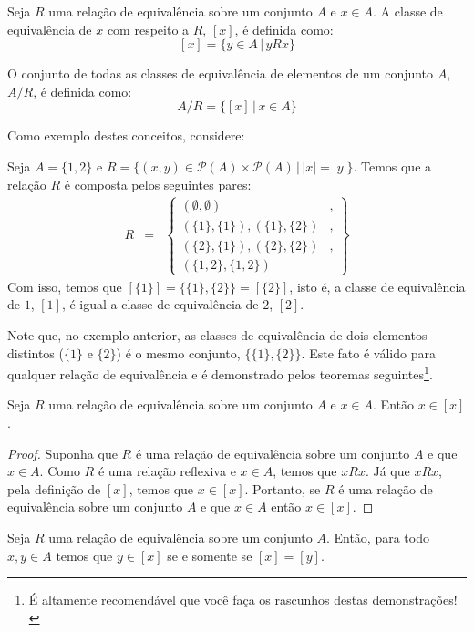 \begin{Definition}
Seja $R$ uma relação de equivalência sobre um conjunto $A$ e $x \in
A$. A classe de equivalência de $x$ com respeito a $R$, $[x]$, é
definida como:
\[
[x] =\{y \in A\,|\, yRx\}
\]

O conjunto de todas as classes de equivalência de elementos de um
conjunto $A$, $A / R$, é definida como:
\[
A / R =\{[x]\,|\,x \in A\}
\]
\end{Definition}
Como exemplo destes conceitos, considere:
\begin{Example}
Seja $A =\{1,2\}$ e $R
=\{(x,y)\in\mathcal{P}(A)\times\mathcal{P}(A)\,|\,|x| = |y|\}$. Temos
que a relação $R$ é composta pelos seguintes pares:
\[
\begin{array}{lcl}
R &=&\left\{
\begin{array}{lc}
   (\emptyset,\emptyset)&,\\
   (\{1\},\{1\}),(\{1\},\{2\}) &,\\
   (\{2\},\{1\}),(\{2\},\{2\}) &,\\
   (\{1,2\},\{1,2\}) &
\end{array}
            \right\}
\end{array}
\]
Com isso, temos que $[\{1\}]=\{\{1\},\{2\}\} = [\{2\}]$, isto é, a
classe de equivalência de $1$, $[1]$, é igual a classe de equivalência
de $2$, $[2]$.
\end{Example}
Note que, no exemplo anterior, as classes de equivalência de dois
elementos distintos ($\{1\}$ e $\{2\}$) é o mesmo conjunto,
$\{\{1\},\{2\}\}$. Este fato é válido para qualquer relação de
equivalência e é demonstrado pelos teoremas seguintes\footnote{É
  altamente recomendável que você faça os rascunhos destas demonstrações!}.
\begin{Theorem}
Seja $R$ uma relação de equivalência sobre um conjunto $A$ e $x \in
A$. Então $x \in [x]$.
\end{Theorem}
\begin{proof}
Suponha que $R$ é uma relação de equivalência sobre um conjunto $A$ e
que $x \in A$. Como $R$ é uma relação reflexiva e $x \in A$, temos que
$xRx$. Já que $xRx$, pela definição de $[x]$, temos que $x\in
[x]$. Portanto, se $R$ é uma relação de equivalência sobre um conjunto $A$ e
que $x \in A$ então $x \in [x]$.
\end{proof}
\begin{Theorem}
Seja $R$ uma relação de equivalência sobre um conjunto $A$. Então,
para todo $x,y \in A$ temos que $y \in [x]$ se e somente se $[x] = [y]$.
\end{Theorem}
